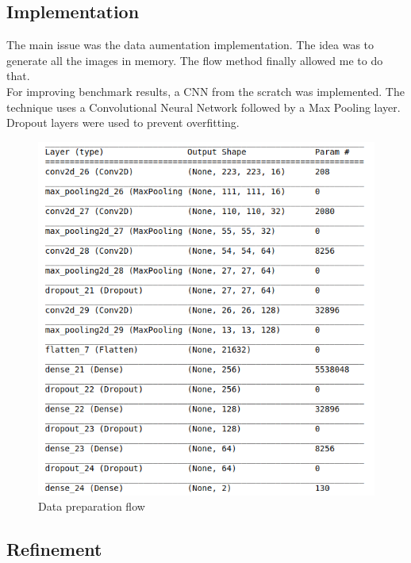 \documentclass[a4paper,10pt]{article}
\begin{document}
\subsection{Implementation}

The main issue was the data aumentation implementation. The idea was to generate all the images in memory. The flow method finally allowed me to do that.\\ 


For improving benchmark results, a CNN from the scratch was implemented. The technique uses a Convolutional Neural Network followed by a Max Pooling layer. \\

Dropout layers were used to prevent overfitting. \\ 

\begin{figure}[ht]
  \includegraphics[width=\linewidth]{my_net.png}
  \caption{Data preparation flow}
  \label{fig:boat1}
\end{figure}

\subsection{Refinement}
\end{document}
